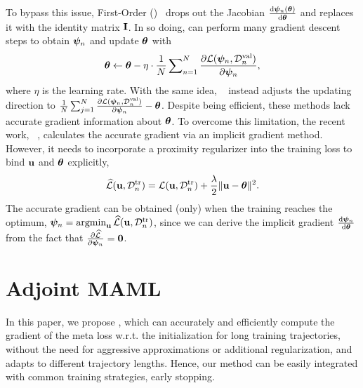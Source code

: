 To bypass this issue, First-Order \maml (\fomaml)~\citep{finn2017model} drops out the Jacobian $\frac{{\rm d} \boldsymbol{\psi}_n(\boldsymbol{\theta})}{{\rm d} \boldsymbol{\theta}}$ and replaces it with the identity matrix ${\bf I}$. In so doing, \fomaml can perform many gradient descent steps to obtain $\boldsymbol{\psi}_n$ and  update $\boldsymbol{\theta}$ with
\[
\boldsymbol{\theta} \leftarrow \boldsymbol{\theta} - \eta \cdot \frac{1}{N}\sum\nolimits_{n=1}^N \frac{\partial \mathcal{L}(\boldsymbol{\psi}_n, \mathcal{D}_n^{\text{val}})}{\partial \boldsymbol{\psi}_n},
\]
where $\eta$ is the learning rate. With the same idea, \rap~\citep{nichol2018first} instead adjusts the updating direction to $\frac{1}{N}\sum_{j=1}^N \frac{\partial \mathcal{L}(\boldsymbol{\psi}_n, \mathcal{D}_n^{\text{val}})}{\partial \boldsymbol{\psi}_n} - \boldsymbol{\theta}$. Despite being efficient, these methods lack accurate gradient information about $\boldsymbol{\theta}$. To overcome this limitation, the recent work, \imaml~\citep{rajeswaran2019meta}, calculates the accurate gradient via an implicit gradient method. However, it needs to incorporate a proximity regularizer into the training loss to bind ${\bf u}$ and $\boldsymbol{\theta}$ explicitly,  
\[
\widehat{\mathcal{L}}({\bf u}, \mathcal{D}_n^{\text{tr}}) = \mathcal{L}({\bf u}, \mathcal{D}_n^{\text{tr}}) + \frac{\lambda}{2} \| {\bf u} - \boldsymbol{\theta}\|^2.
\]
The accurate gradient can be obtained (only) when the training reaches the optimum, \ie $\bpsi_n = \argmin_{\u} \widehat{\Lcal}(\u, \Dcal_n^{\text{tr}}) $, since  we can derive the implicit gradient $\frac{{\rm d} \boldsymbol{\psi}_n}{{\rm d} \boldsymbol{\theta}}$ from the fact  that $\frac{\partial \widehat{\mathcal{L}}}{\partial \boldsymbol{\psi}_n} = {\bf 0}$.


\section{Adjoint MAML}
In this paper, we propose \ours, which can accurately and efficiently compute the gradient of the meta loss w.r.t. the initialization for long training trajectories, without the need for aggressive approximations or additional regularization, and adapts to different trajectory lengths. Hence, our method can be easily integrated with common training strategies, \eg early stopping. 

